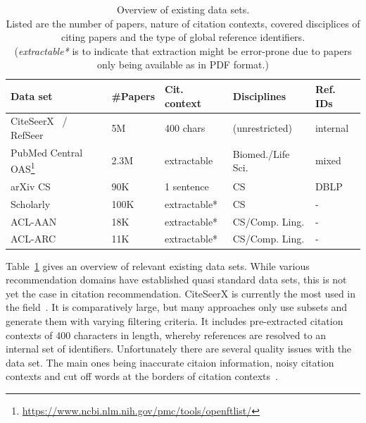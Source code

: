 \begin{table}
\centering
    \caption[Overview of existing data sets.]{Overview of existing data sets.\\Listed are the number of papers, nature of citation contexts, covered disciplices of citing papers and the type of global reference identifiers.\\(\emph{extractable*} is to indicate that extraction might be error-prone due to papers only being available as in PDF format.)}
    \label{tab:datasets}
\begin{center}
    \begin{tabular}{lllll}
    \toprule
    Data set & \#Papers & Cit. context & Disciplines & Ref. IDs \\
    \midrule
    CiteSeerX~\cite{Caragea2014} / RefSeer~\cite{Huang2014} & 5M & 400 chars & (unrestricted) & internal \\
    PubMed Central OAS\footnote{\url{https://www.ncbi.nlm.nih.gov/pmc/tools/openftlist/}} & 2.3M & extractable & Biomed./Life Sci. & mixed \\
    arXiv CS~\cite{Faerber2018} &  90K & 1 sentence & CS & DBLP \\
    Scholarly~\cite{Sugiyama2013}  & 100K & extractable* & CS & - \\
    ACL-AAN  & 18K & extractable* & CS/Comp. Ling. & -  \\ %
    ACL-ARC  & 11K & extractable* & CS/Comp. Ling. & - \\ %
    \bottomrule
    \end{tabular}
\end{center}
\end{table}

Table~\ref{tab:datasets} gives an overview of relevant existing data sets. While various recommendation domains have established quasi standard data sets, this is not yet the case in citation recommendation. CiteSeerX is currently the most used in the field~\cite{Beel2016}. It is comparatively large, but many approaches only use subsets and generate them with varying filtering criteria. It includes pre-extracted citation contexts of 400 characters in length, whereby references are resolved to an internal set of identifiers. Unfortunately there are several quality issues with the data set. The main ones being inaccurate citaion information, noisy citation contexts and cut off words at the borders of citation contexts~\cite{Roy2016}.

